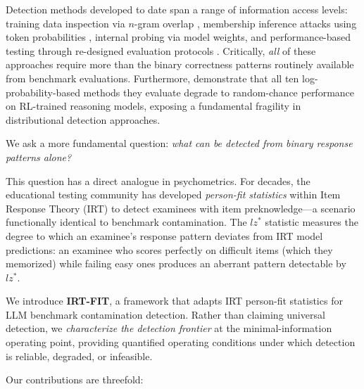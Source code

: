 \documentclass[11pt]{article}
\begin{document}
Detection methods developed to date span a range of information access levels: training data inspection via $n$-gram overlap \citep{brown2020language}, membership inference attacks using token probabilities \citep{shi2024detecting}, internal probing via model weights, and performance-based testing through re-designed evaluation protocols \citep{dekoninck2024constat}.
Critically, \emph{all} of these approaches require more than the binary correctness patterns routinely available from benchmark evaluations.
Furthermore, \citet{wang2025rl} demonstrate that all ten log-probability-based methods they evaluate degrade to random-chance performance on RL-trained reasoning models, exposing a fundamental fragility in distributional detection approaches.

We ask a more fundamental question: \emph{what can be detected from binary response patterns alone?}

This question has a direct analogue in psychometrics. For decades, the educational testing community has developed \emph{person-fit statistics} within Item Response Theory (IRT) to detect examinees with item preknowledge---a scenario functionally identical to benchmark contamination.
The $lz^*$ statistic \citep{snijders2001} measures the degree to which an examinee's response pattern deviates from IRT model predictions: an examinee who scores perfectly on difficult items (which they memorized) while failing easy ones produces an aberrant pattern detectable by $lz^*$.

We introduce \textbf{IRT-FIT}, a framework that adapts IRT person-fit statistics for LLM benchmark contamination detection.
Rather than claiming universal detection, we \emph{characterize the detection frontier} at the minimal-information operating point, providing quantified operating conditions under which detection is reliable, degraded, or infeasible.

Our contributions are threefold:
\end{document}
